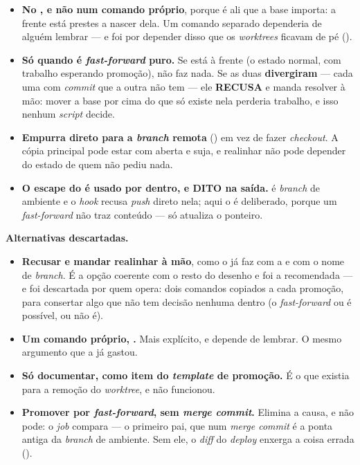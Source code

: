 \begin{itemize}
  \item \textbf{No , e não num comando próprio}, porque é ali que a
    base importa: a frente está prestes a nascer dela. Um comando separado
    dependeria de alguém lembrar --- e foi por depender disso que os
    \emph{worktrees} ficavam de pé ().
  \item \textbf{Só quando é \emph{fast-forward} puro.} Se  está à
    frente (o estado normal, com trabalho esperando promoção), não faz nada. Se
    as duas \textbf{divergiram} --- cada uma com \emph{commit} que a outra não
    tem --- ele \textbf{RECUSA} e manda resolver à mão: mover a base por cima do
    que só existe nela perderia trabalho, e isso nenhum \emph{script} decide.
  \item \textbf{Empurra  direto para a \emph{branch} remota}
    () em vez de fazer
    \emph{checkout}. A cópia principal pode estar com  aberta e
    suja, e realinhar não pode depender do estado de quem não pediu nada.
  \item \textbf{O escape do  é usado por dentro, e DITO na saída.}
     é \emph{branch} de ambiente e o \emph{hook} recusa
    \emph{push} direto nela; aqui o  é deliberado,
    porque um \emph{fast-forward} não traz conteúdo --- só atualiza o ponteiro.
\end{itemize}

\textbf{Alternativas descartadas.}

\begin{itemize}
  \item \textbf{Recusar e mandar realinhar à mão}, como o  já faz com
    a  e com o nome de \emph{branch}. É a opção coerente com o resto
    do desenho e foi a recomendada --- e foi descartada por quem opera: dois
    comandos copiados a cada promoção, para consertar algo que não tem decisão
    nenhuma dentro (o \emph{fast-forward} ou é possível, ou não é).
  \item \textbf{Um comando próprio, .} Mais explícito, e
    depende de lembrar. O mesmo argumento que a  já gastou.
  \item \textbf{Só documentar, como item do \emph{template} de promoção.}
    É o que existia para a remoção do \emph{worktree}, e não funcionou.
  \item \textbf{Promover por \emph{fast-forward}, sem \emph{merge commit}.}
    Elimina a causa, e não pode: o \emph{job}  compara
     --- o primeiro pai, que num \emph{merge commit} é a ponta
    antiga da \emph{branch} de ambiente. Sem ele, o \emph{diff} do \emph{deploy}
    enxerga a coisa errada ().
\end{itemize}

